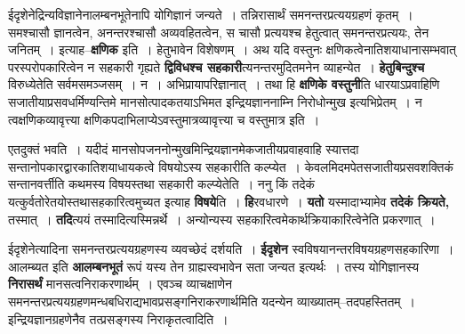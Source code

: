 \documentclass[article,12pt,a4paper]{memoir}
\begin{document}
	ईदृशेनेद्रिन्यविज्ञानेनालम्बनभूतेनापि योगिज्ञानं जन्यते । तन्निरासार्थं समनन्तरप्रत्ययग्रहणं कृतम् । समश्चासौ ज्ञानत्वेन, अनन्तरश्चासौ अव्यवहितत्वेन, स चासौ प्रत्ययश्च हेतुत्वात् समनन्तरप्रत्ययः, तेन जनितम् । इत्याह--\textbf{क्षणिक} इति । हेतुभावेन विशेषणम् । अथ यदि वस्तुनः क्षणिकत्वेनातिशयाधानासम्भवात् परस्परोपकारित्वेन न सहकारी गृह्यते \textbf{द्विविधश्च सहकारी}त्यनन्तरमुदितमनेन व्याहन्येत । \textbf{हेतुबिन्दुश्च} विरुध्येतेति सर्वमसमञ्जसम् । न । अभिप्रायापरिज्ञानात् । तथा हि \textbf{क्षणिके वस्तुनी}ति धारयाऽप्रवाहिणि सजातीयाप्रसवधर्मिण्यन्तिमे मानसोत्पादकतयाऽभिमत इन्द्रियज्ञाननाम्नि निरोधोन्मुख इत्यभिप्रेतम् । न त्वक्षणिकव्यावृत्त्या क्षणिकपदाभिलाप्येऽवस्तुमात्रव्यावृत्त्या च वस्तुमात्र इति ।
	\pend
      

	  \pstart एतदुक्तं भवति । यदीदं मानसोपजननोन्मुखमिन्द्रियज्ञानमेकजातीयप्रवाहवाहि स्यात्तदा सन्तानोपकारद्वारकातिशयाधायकत्वे विषयोऽस्य सहकारीति कल्प्येत । केवलमिदमपेतसजातीयप्रसवशक्तिकं सन्तानवर्त्तीति कथमस्य विषयस्तथा सहकारी कल्प्येतेति । ननु किं तदेकं यत्कुर्वतोरेतयोस्तथासहकारित्वमुच्यत इत्याह \textbf{विषये}ति । \textbf{हि}रवधारणे । \textbf{यतो} यस्मादाभ्यामेव \textbf{तदेकं क्रियते,} तस्मात् । \textbf{तदि}त्ययं तस्मादित्यस्मिन्नर्थे । अन्योन्यस्य सहकारित्वमेकार्थक्रियाकारित्वेनेति प्रकरणात् ।
	\pend
      

	  \pstart ईदृशेनेत्यादिना समनन्तरप्रत्ययग्रहणस्य व्यवच्छेदं दर्शयति । \textbf{ईदृशेन} स्वविषयानन्तरविषयग्रह\leavevmode{}णसहकारिणा । आलम्ब्यत इति \textbf{आलम्बनभूतं} रूपं यस्य तेन ग्राह्यस्वभावेन सता जन्यत इत्यर्थः । तस्य योगिज्ञानस्य \textbf{निरासर्थं} मानसत्वनिराकरणार्थम् । एवञ्च व्याचक्षाणेन समनन्तरप्रत्ययग्रहणमन्धबधिराद्यभावप्रसङ्गनिराकरणार्थमिति यदन्येन व्याख्यातम्--तदपहस्तितम् । इन्द्रियज्ञानग्रहणेनैव तत्प्रसङ्गस्य निराकृतत्वादिति ।
	\pend
      
\end{document}
